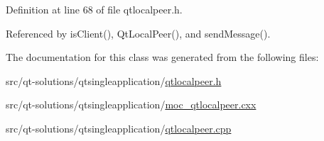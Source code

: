 Definition at line 68 of file qtlocalpeer.\-h.



Referenced by is\-Client(), Qt\-Local\-Peer(), and send\-Message().



The documentation for this class was generated from the following files\-:\begin{DoxyCompactItemize}
\item 
src/qt-\/solutions/qtsingleapplication/\hyperlink{qtlocalpeer_8h}{qtlocalpeer.\-h}\item 
src/qt-\/solutions/qtsingleapplication/\hyperlink{moc__qtlocalpeer_8cxx}{moc\-\_\-qtlocalpeer.\-cxx}\item 
src/qt-\/solutions/qtsingleapplication/\hyperlink{qtlocalpeer_8cpp}{qtlocalpeer.\-cpp}\end{DoxyCompactItemize}
